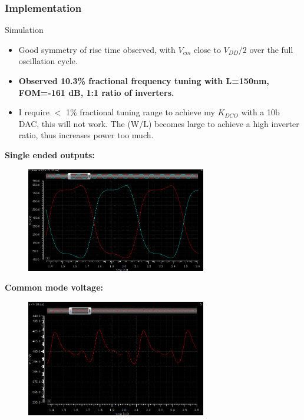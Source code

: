 \documentclass[t, screen, aspectratio=43]{beamer}
\begin{document}
\begin{frame}
	\frametitle{Implementation}
	\begin{block}{Simulation}
		\begin{minipage}{6cm}
			\vspace{1em}
			\tiny

			\begin{itemize}[itemsep=4pt,label=\protect---]
				\item Good symmetry of rise time observed, with $V_{cm}$ close to $V_{DD}/2$ over the full oscillation cycle.
				\item \textbf{Observed 10.3\% fractional frequency tuning with L=150nm, FOM=-161 dB, 1:1 ratio of inverters.}
				\item I require $<$ 1\% fractional tuning range to achieve my $K_{DCO}$ with a 10b DAC, this will not work. The (W/L) becomes large to achieve a high inverter ratio, thus increases power too much.
			\end{itemize}
		\end{minipage}%
		\begin{minipage}{6cm}
			\tiny
			\hspace{1em}\color{red}\textbf{Single ended outputs:}
			\vspace{-1em}
			\begin{figure}[htb!]
			        \centering
			        \includegraphics[width=0.7\textwidth, angle=0]{parallel_osc_wfm}
			\end{figure}
			\vspace{-1em}
			\hspace{1em}\textbf{Common mode voltage:}
			\vspace{-1em}
			\begin{figure}[htb!]
			        \centering
			        \includegraphics[width=0.7\textwidth, angle=0]{parallel_cmv}

\end{figure}
\end{minipage}
\end{block}
\end{frame}
\end{document}
